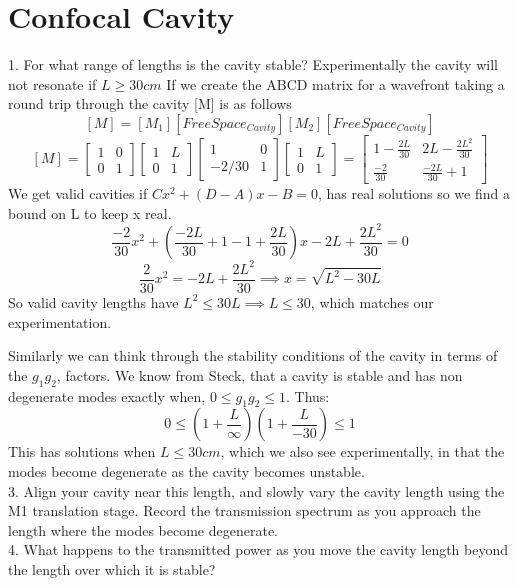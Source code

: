 \documentclass[11pt]{article}
\begin{document}
\section{Confocal Cavity}

1. For what range of lengths is the cavity stable?
Experimentally the cavity will not resonate if $L \geq 30cm$
If we create the ABCD matrix for a wavefront taking a round trip through the cavity [M] is as follows
$$ [M] = [M_1][FreeSpace_{Cavity}][M_2][FreeSpace_{Cavity}]$$
$$ [M] = \begin{bmatrix} 1 & 0 \\ 0 & 1  \end{bmatrix}  \begin{bmatrix}1 & L \\0 & 1 \end{bmatrix} \begin{bmatrix} 1 & 0 \\ -2/30 & 1  \end{bmatrix} \begin{bmatrix} 1 & L \\ 0 & 1  \end{bmatrix} = \begin{bmatrix} 1 - \frac{2L}{30} & 2L - \frac{2L^2}{30} \\ \frac{-2}{30} & \frac{-2L}{30} + 1  \end{bmatrix}$$
We get valid cavities if $Cx^2 + (D-A)x - B = 0$, has real solutions so we find a bound on L to keep x real. 
$$ \frac{-2}{30}x^2 + (\frac{-2L}{30} + 1 - 1 + \frac{2L}{30} )x - 2L + \frac{2L^2}{30} = 0 $$
$$ \frac{2}{30}x^2 = -2L + \frac{2L^2}{30} \implies x = \sqrt{L^2 - 30L}$$
So valid cavity lengths have $L^2 \leq 30L \implies L \leq 30 $, which matches our experimentation.

Similarly we can think through the stability conditions of the cavity in terms of the $g_1g_2$, factors. We know from Steck, that a cavity is stable and has non degenerate modes exactly when, $0 \leq g_1g_2 \leq 1$. Thus: \\
$$0 \leq (1+\frac{L}{\infty})(1+\frac{L}{-30}) \leq 1 $$ This has solutions when $L \leq 30 cm$, which we also see experimentally, in that the modes become degenerate as the cavity becomes unstable. \\

3. Align your cavity near this length, and slowly vary the cavity length using the M1 translation stage. Record the transmission spectrum as you approach the length where the modes become degenerate. \\

4. What happens to the transmitted power as you move the cavity length beyond the length over which it is stable?
\end{document}
